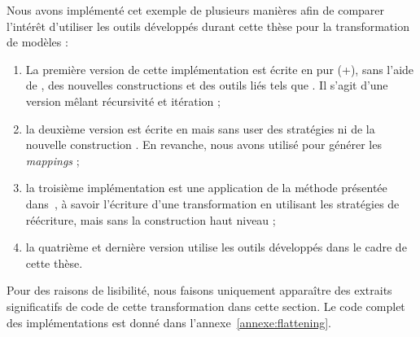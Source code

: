 
Nous avons implémenté cet exemple de plusieurs manières afin de comparer
l'intérêt d'utiliser les outils développés durant cette thèse pour la
transformation de modèles :

\begin{enumerate}


  \item La première version de cette implémentation est écrite en pur {\java}
    (+{\emf}), sans l'aide de {\tom}, des nouvelles constructions et des outils
    liés tels que {\tomemf}. Il s'agit d'une version mêlant récursivité et
    itération ;


  \item la deuxième version est écrite en {\tomjava} mais sans user des
    stratégies ni de la nouvelle construction . En
    revanche, nous avons utilisé {\tomemf} pour générer les \emph{mappings} ;


  \item la troisième implémentation est une application de la méthode présentée
    dans~\cite{Bach2012}, à savoir l'écriture d'une transformation en utilisant
    les stratégies de réécriture, mais sans la construction haut niveau
     ;


  \item la quatrième et dernière version utilise les outils développés dans le
    cadre de cette thèse.

\end{enumerate}

Pour des raisons de lisibilité, nous faisons uniquement apparaître des extraits
significatifs de code de cette transformation dans cette section. Le code
complet des implémentations est donné dans l'annexe~\ref{annexe:flattening}.


